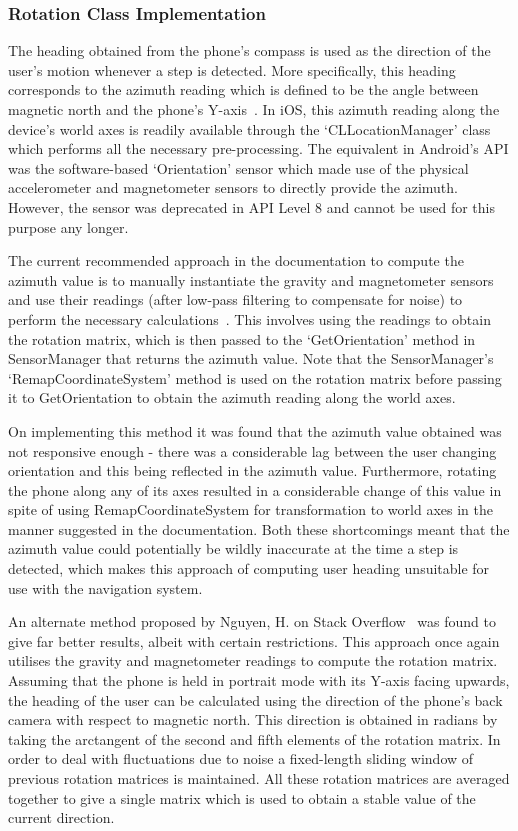 \documentclass[main.tex]{subfiles}
\begin{document}
        \subsubsection{Rotation Class Implementation}
            The heading obtained from the phone's compass is used as the direction of the user's motion whenever a step is detected. More specifically, this heading corresponds to the azimuth reading which is defined to be the angle between magnetic north and the phone's Y-axis~\cite{azimuthDefinition}. In iOS, this azimuth reading along the device's world axes is readily available through the `CLLocationManager' class which performs all the necessary pre-processing. The equivalent in Android's API was the software-based `Orientation' sensor which made use of the physical accelerometer and magnetometer sensors to directly provide the azimuth. However, the sensor was deprecated in API Level 8 and cannot be used for this purpose any longer. 

The current recommended approach in the documentation to compute the azimuth value is to manually instantiate the gravity and magnetometer sensors and use their readings (after low-pass filtering to compensate for noise) to perform the necessary calculations~\cite{ENU}. This involves using the readings to obtain the rotation matrix, which is then passed to the `GetOrientation' method in SensorManager that returns the azimuth value. Note that the SensorManager's `RemapCoordinateSystem' method is used on the rotation matrix before passing it to GetOrientation to obtain the azimuth reading along the world axes.  

On implementing this method it was found that the azimuth value obtained was not responsive enough - there was a considerable lag between the user changing orientation and this being reflected in the azimuth value. Furthermore, rotating the phone along any of its axes resulted in a considerable change of this value in spite of using RemapCoordinateSystem for transformation to world axes in the manner suggested in the documentation. Both these shortcomings meant that the azimuth value could potentially be wildly inaccurate at the time a step is detected, which makes this approach of computing user heading unsuitable for use with the navigation system. 

An alternate method proposed by Nguyen, H. on Stack Overflow~\cite{azimuthFinal} was found to give far better results, albeit with certain restrictions. This approach once again utilises the gravity and magnetometer readings to compute the rotation matrix. Assuming that the phone is held in portrait mode with its Y-axis facing upwards, the heading of the user can be calculated using the direction of the phone's back camera with respect to magnetic north. This direction is obtained in radians by taking the arctangent of the second and fifth elements of the rotation matrix. In order to deal with fluctuations due to noise a fixed-length sliding window of previous rotation matrices is maintained. All these rotation matrices are averaged together to give a single matrix which is used to obtain a stable value of the current direction.
\end{document}
